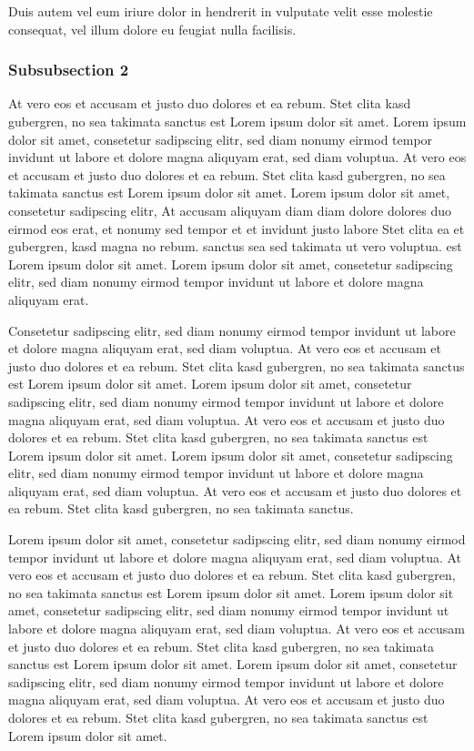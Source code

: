 Duis autem vel eum iriure dolor in hendrerit in vulputate velit esse molestie consequat, vel illum dolore eu feugiat nulla facilisis. 
\subsubsection{Subsubsection 2}
At vero eos et accusam et justo duo dolores et ea rebum. Stet clita kasd gubergren, no sea takimata sanctus est Lorem ipsum dolor sit amet. Lorem ipsum dolor sit amet, consetetur sadipscing elitr, sed diam nonumy eirmod tempor invidunt ut labore et dolore magna aliquyam erat, sed diam voluptua. At vero eos et accusam et justo duo dolores et ea rebum. Stet clita kasd gubergren, no sea takimata sanctus est Lorem ipsum dolor sit amet. Lorem ipsum dolor sit amet, consetetur sadipscing elitr, At accusam aliquyam diam diam dolore dolores duo eirmod eos erat, et nonumy sed tempor et et invidunt justo labore Stet clita ea et gubergren, kasd magna no rebum. sanctus sea sed takimata ut vero voluptua. est Lorem ipsum dolor sit amet. Lorem ipsum dolor sit amet, consetetur sadipscing elitr, sed diam nonumy eirmod tempor invidunt ut labore et dolore magna aliquyam erat.

Consetetur sadipscing elitr, sed diam nonumy eirmod tempor invidunt ut labore et dolore magna aliquyam erat, sed diam voluptua. At vero eos et accusam et justo duo dolores et ea rebum. Stet clita kasd gubergren, no sea takimata sanctus est Lorem ipsum dolor sit amet. Lorem ipsum dolor sit amet, consetetur sadipscing elitr, sed diam nonumy eirmod tempor invidunt ut labore et dolore magna aliquyam erat, sed diam voluptua. At vero eos et accusam et justo duo dolores et ea rebum. Stet clita kasd gubergren, no sea takimata sanctus est Lorem ipsum dolor sit amet. Lorem ipsum dolor sit amet, consetetur sadipscing elitr, sed diam nonumy eirmod tempor invidunt ut labore et dolore magna aliquyam erat, sed diam voluptua. At vero eos et accusam et justo duo dolores et ea rebum. Stet clita kasd gubergren, no sea takimata sanctus.

Lorem ipsum dolor sit amet, consetetur sadipscing elitr, sed diam nonumy eirmod tempor invidunt ut labore et dolore magna aliquyam erat, sed diam voluptua. At vero eos et accusam et justo duo dolores et ea rebum. Stet clita kasd gubergren, no sea takimata sanctus est Lorem ipsum dolor sit amet. Lorem ipsum dolor sit amet, consetetur sadipscing elitr, sed diam nonumy eirmod tempor invidunt ut labore et dolore magna aliquyam erat, sed diam voluptua. At vero eos et accusam et justo duo dolores et ea rebum. Stet clita kasd gubergren, no sea takimata sanctus est Lorem ipsum dolor sit amet. Lorem ipsum dolor sit amet, consetetur sadipscing elitr, sed diam nonumy eirmod tempor invidunt ut labore et dolore magna aliquyam erat, sed diam voluptua. At vero eos et accusam et justo duo dolores et ea rebum. Stet clita kasd gubergren, no sea takimata sanctus est Lorem ipsum dolor sit amet.

